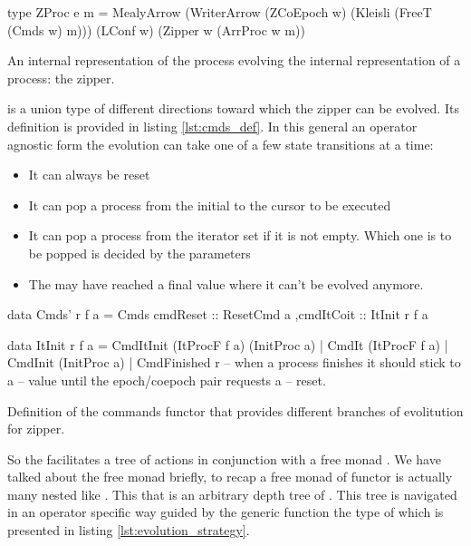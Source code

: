 \begin{code}
\begin{haskellcode}
type ZProc e m =
  MealyArrow
    (WriterArrow (ZCoEpoch w) (Kleisli (FreeT (Cmds w) m)))
    (LConf w)
    (Zipper w (ArrProc w m))
\end{haskellcode}
  \caption{\label{lst:zproc_def}An internal representation of the
    process evolving the internal representation of a process: the
    zipper.}
\end{code}


 is a union type of different directions toward which the
zipper can be evolved. Its definition is provided in listing
\ref{lst:cmds_def}. In this general an operator agnostic form the
evolution can take one of a few state transitions at a time:

\begin{itemize}
\item It can always be reset
\item It can pop a process from the initial to the cursor to be executed
\item It can pop a process from the iterator set if it is not
  empty. Which one is to be popped is decided by the parameters
\item The may have reached a final value where it can't be evolved
  anymore.
\end{itemize}

\begin{code}
\begin{haskellcode}
data Cmds' r f a =
  Cmds { cmdReset :: ResetCmd a
        ,cmdItCoit :: ItInit r f a
       }

data ItInit r f a
  = CmdItInit (ItProcF f a) (InitProc a)
  | CmdIt (ItProcF f a)
  | CmdInit (InitProc a)
  | CmdFinished r -- when a process finishes it should stick to a
                  -- value until the epoch/coepoch pair requests a
                  -- reset.
\end{haskellcode}
  \caption{\label{lst:cmds_def}Definition of the commands functor that
    provides different branches of evolitution for zipper.}
\end{code}

So the  facilitates a tree of actions in conjunction with a
free monad .  We have talked about the free monad briefly, to recap a
free monad of functor  is actually many  nested like
. This  that  is
an arbitrary depth tree of . This tree is navigated in an
operator specific way guided by the generic function
 the type of which is presented in listing
\ref{lst:evolution_strategy}.

